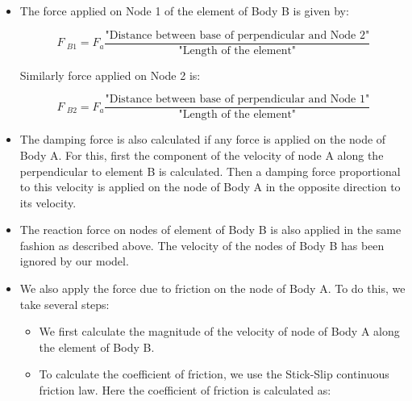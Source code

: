 \documentclass[12pt]{report}
\begin{document}
\begin{itemize}
	\item The force applied on Node 1 of the element of Body B is given by:\par

\begin{Center}
 \[ F~_{B1}= F_{a}\frac{\text{"Distance between base of perpendicular and Node 2"}}{\text{"Length of the element"}} \] 
\end{Center}\par

\begin{FlushLeft}
Similarly force applied on Node 2 is:
\end{FlushLeft}\par

\begin{Center}
 \[ F~_{B2}= F_{a}\frac{\text{"Distance between base of perpendicular and Node 1"}}{\text{"Length of the element"}} \] 
\end{Center}\par

	\item The damping force is also calculated if any force is applied on the node of Body A. For this, first the component of the velocity of node A along the perpendicular to element B is calculated. Then a damping force proportional to this velocity is applied on the node of Body A in the opposite direction to its velocity.\par

	\item The reaction force on nodes of element of Body B is also applied in the same fashion as described above. The velocity of the nodes of Body B has been ignored by our model.\par

	\item We also apply the force due to friction on the node of Body A. To do this, we take several steps:\par

\begin{itemize}
	\item We first calculate the magnitude of the velocity of node of Body A along the element of Body B. \par

	\item To calculate the coefficient of friction, we use the Stick-Slip continuous friction law. Here the coefficient of friction is calculated as:\par


\end{itemize}
\end{itemize}
\end{document}
